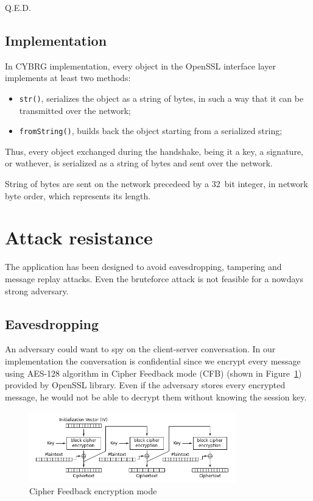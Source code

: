 \documentclass[a4paper,12pt]{article}
\newcommand{\projectname}{CYBRG}
\begin{document}
Q.E.D.

\subsection{Implementation}
In \projectname{} implementation, every object in the OpenSSL interface layer implements at least two methods:
\begin{itemize}
  \item \texttt{str()}, serializes the object as a string of bytes, in such a way that it can be transmitted over the network;
  \item \texttt{fromString()}, builds back the object starting from a serialized string;
\end{itemize}

Thus, every object exchanged during the handshake, being it a key, a signature, or wathever, is serialized as a string of bytes and sent over the network.

String of bytes are sent on the network precedeed by a 32~bit integer, in network byte order, which represents its length.

\section{Attack resistance}

The application has been designed to avoid eavesdropping, tampering and message replay attacks. Even the bruteforce attack is not feasible for a nowdays strong adversary.

\subsection{Eavesdropping}
An adversary could want to spy on the client-server conversation. In our implementation the conversation is confidential since we encrypt every message using AES-128 algorithm in Cipher Feedback mode (CFB) (shown in Figure~\ref{img:cfb-enc-mode}) provided by OpenSSL library.
Even if the adversary stores every encrypted message, he would not be able to decrypt them without knowing the session key.

\begin{figure}[H]
\centering
\includegraphics[width=0.8\textwidth]{img/CFB-enc-mode}
\caption{Cipher Feedback encryption mode}
\label{img:cfb-enc-mode}
\end{figure}
\end{document}
